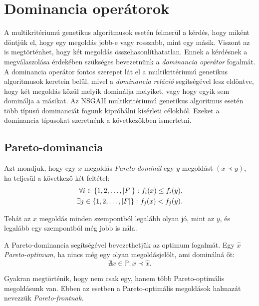 \section{Dominancia operátorok}\label{sec:DOMINANCIA_OPERATOROK}
A multikritériumú genetikus algoritmusok esetén felmerül a kérdés, hogy miként döntjük el, hogy egy megoldás jobb-e vagy rosszabb, mint egy másik.
Viszont az is megtörténhet, hogy két megoldás összehasonlíthatatlan.
Ennek a kérdésnek a megválaszolása érdekében szükséges bevezetnünk a \emph{dominancia operátor} fogalmát.
A dominancia operátor fontos szerepet lát el a multikritériumú genetikus algoritmusok keretein belül,
mivel a \emph{dominancia reláció} segítségével lesz eldöntve, hogy két megoldás közül melyik dominálja melyiket, vagy hogy egyik sem dominálja a másikat.
Az NSGAII multikritériumú genetikus algoritmus esetén több típusú dominanciát fogunk kipróbálni kísérleti célokból.
Ezeket a dominancia típusokat szeretnénk a következőkben ismertetni.


\subsection{Pareto-dominancia}
\begin{ert}
  Azt mondjuk, hogy egy $x$ megoldás \emph{Pareto-dominál} egy $y$ megoldást $\left( x \prec y \right)$, ha teljesül a következő két feltétel:
  \begin{align*}
    \forall i \in \left\{ 1, 2, \dots, \lvert F\rvert \right\} \colon f_i(x) \leq f_i(y), \\
    \exists j \in \left\{ 1, 2, \dots, \lvert F\rvert \right\} \colon f_j(x) < f_j(y).
  \end{align*}
\end{ert}

Tehát az $x$ megoldás minden szempontból legalább olyan jó, mint az $y$, és legalább egy szempontból még jobb is nála.


\begin{ert}
  A Pareto-dominancia segítségével bevezethetjük az optimum fogalmát.
  Egy $\hat{x}$ \emph{Pareto-optimum}, ha nincs még egy olyan megoldásjelölt, ami dominálná őt:
  \[
    \nexists x \in \mathbb{P} \colon x \prec \hat{x}.
  \]
\end{ert}


\begin{ert}
  Gyakran megtörténik, hogy nem csak egy, hanem több Pareto-optimális megoldásunk van.
  Ebben az esetben a Pareto-optimális megoldások halmazát nevezzük \emph{Pareto-frontnak}.
\end{ert}


